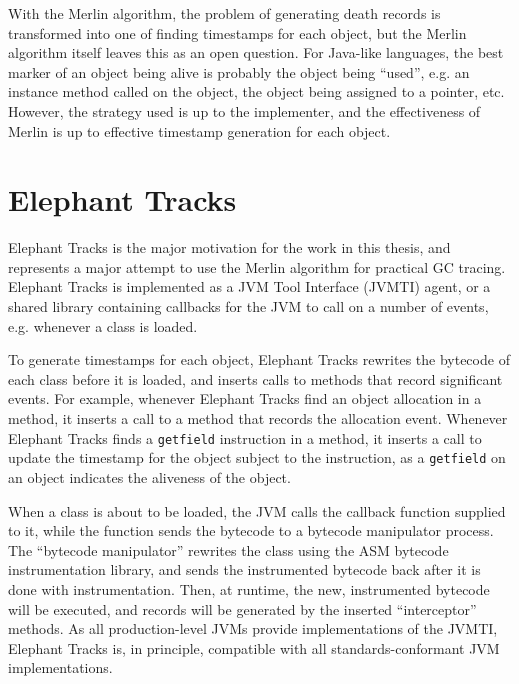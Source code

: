 With the Merlin algorithm, the problem of generating death records is transformed into one of finding timestamps
for each object, but the Merlin algorithm itself leaves this as an open question. For Java-like languages, the
best marker of an object being alive is probably the object being ``used'', e.g. an instance method called on the
object, the object being assigned to a pointer, etc. However, the strategy used is up to the implementer, and
the effectiveness of Merlin is up to effective timestamp generation for each object.

\section{Elephant Tracks}
Elephant Tracks \citep{ElephantTracks} is the major motivation for the work in this thesis, and represents a major attempt
to use the Merlin algorithm for practical GC tracing. Elephant Tracks is implemented as a JVM Tool Interface (JVMTI) agent, or a shared library
containing callbacks for the JVM to call on a number of events, e.g. whenever a class is loaded.

To generate timestamps for each object, Elephant Tracks rewrites the bytecode of each class before it is loaded, and inserts
calls to methods that record significant events. For example, whenever Elephant Tracks find an object allocation in a method,
it inserts a call to a method that records the allocation event. Whenever Elephant Tracks finds a \texttt{getfield} instruction
in a method, it inserts a call to update the timestamp for the object subject to the instruction, as a \texttt{getfield} on an
object indicates the aliveness of the object.

When a class is about to be loaded, the JVM calls the callback function supplied to it,
while the function sends the bytecode to a bytecode manipulator process. The ``bytecode manipulator'' rewrites the class using
the ASM bytecode instrumentation library, and sends the instrumented bytecode back after it is done with instrumentation. Then, at
runtime, the new, instrumented bytecode will be executed, and records will be generated by the inserted ``interceptor'' methods. As
all production-level JVMs provide implementations of the JVMTI, Elephant Tracks is, in principle, compatible with all standards-conformant
JVM implementations.

